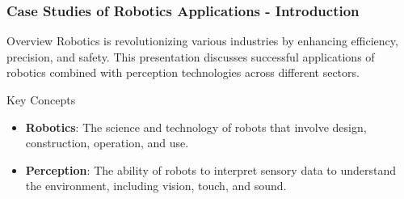 \documentclass{beamer}
\begin{document}
\begin{frame}[fragile]
    \frametitle{Case Studies of Robotics Applications - Introduction}
    \begin{block}{Overview}
        Robotics is revolutionizing various industries by enhancing efficiency, precision, and safety. 
        This presentation discusses successful applications of robotics combined with perception technologies across different sectors.
    \end{block}
    \begin{block}{Key Concepts}
        \begin{itemize}
            \item \textbf{Robotics}: The science and technology of robots that involve design, construction, operation, and use.
            \item \textbf{Perception}: The ability of robots to interpret sensory data to understand the environment, including vision, touch, and sound.
        \end{itemize}
    \end{block}
\end{frame}
\end{document}
